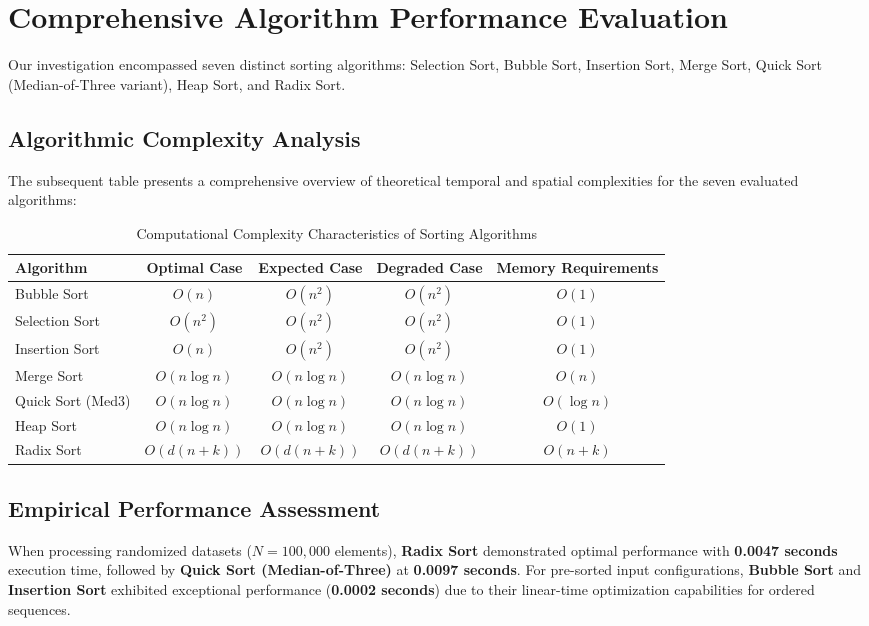 \documentclass[12pt,a4paper]{article}
\begin{document}
\section{Comprehensive Algorithm Performance Evaluation}
Our investigation encompassed seven distinct sorting algorithms: Selection Sort, Bubble Sort, Insertion Sort, Merge Sort, Quick Sort (Median-of-Three variant), Heap Sort, and Radix Sort.

\subsection{Algorithmic Complexity Analysis}
The subsequent table presents a comprehensive overview of theoretical temporal and spatial complexities for the seven evaluated algorithms:

\begin{table}[H]
\centering
\caption{Computational Complexity Characteristics of Sorting Algorithms}
\begin{tabular}{lcccc}
\toprule
\textbf{Algorithm} & \textbf{Optimal Case} & \textbf{Expected Case} & \textbf{Degraded Case} & \textbf{Memory Requirements} \\
\midrule
Bubble Sort & $O(n)$ & $O(n^2)$ & $O(n^2)$ & $O(1)$ \\
Selection Sort & $O(n^2)$ & $O(n^2)$ & $O(n^2)$ & $O(1)$ \\
Insertion Sort & $O(n)$ & $O(n^2)$ & $O(n^2)$ & $O(1)$ \\
Merge Sort & $O(n \log n)$ & $O(n \log n)$ & $O(n \log n)$ & $O(n)$ \\
Quick Sort (Med3) & $O(n \log n)$ & $O(n \log n)$ & $O(n \log n)$ & $O(\log n)$ \\
Heap Sort & $O(n \log n)$ & $O(n \log n)$ & $O(n \log n)$ & $O(1)$ \\
Radix Sort & $O(d(n+k))$ & $O(d(n+k))$ & $O(d(n+k))$ & $O(n+k)$ \\
\bottomrule
\end{tabular}
\end{table}

\subsection{Empirical Performance Assessment}

When processing randomized datasets ($N=100{,}000$ elements), \textbf{Radix Sort} demonstrated optimal performance with \textbf{0.0047 seconds} execution time, followed by \textbf{Quick Sort (Median-of-Three)} at \textbf{0.0097 seconds}. For pre-sorted input configurations, \textbf{Bubble Sort} and \textbf{Insertion Sort} exhibited exceptional performance (\textbf{0.0002 seconds}) due to their linear-time optimization capabilities for ordered sequences.
\end{document}
